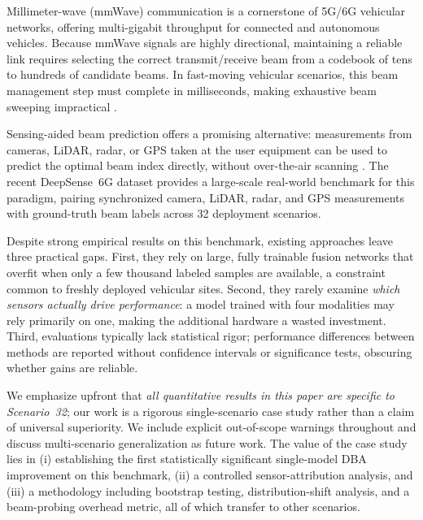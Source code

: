 \documentclass[journal,10pt,twoside]{IEEEtran}
\begin{document}
Millimeter-wave (mmWave) communication is a cornerstone of 5G/6G vehicular
networks, offering multi-gigabit throughput for connected and autonomous vehicles.
Because mmWave signals are highly directional, maintaining a reliable link
requires selecting the correct transmit/receive beam from a codebook of tens to
hundreds of candidate beams. In fast-moving vehicular scenarios, this beam
management step must complete in milliseconds, making exhaustive beam sweeping
impractical \cite{alkhateeb2018deep,va2016beam}.

Sensing-aided beam prediction offers a promising alternative: measurements
from cameras, LiDAR, radar, or GPS taken at the user equipment can be used
to predict the optimal beam index directly, without over-the-air scanning
\cite{charan2021vision,maeng2024multimodal,deepsense6g_2023}. The recent
DeepSense~6G dataset \cite{deepsense6g_2023} provides a large-scale real-world
benchmark for this paradigm, pairing synchronized camera, LiDAR, radar, and GPS
measurements with ground-truth beam labels across 32 deployment scenarios.

Despite strong empirical results on this benchmark, existing approaches leave
three practical gaps. First, they rely on large, fully trainable fusion networks
that overfit when only a few thousand labeled samples are available, a constraint common to freshly deployed vehicular sites. Second, they rarely examine
\emph{which sensors actually drive performance}: a model trained with four
modalities may rely primarily on one, making the additional hardware a wasted
investment. Third, evaluations typically lack statistical rigor; performance
differences between methods are reported without confidence intervals or
significance tests, obscuring whether gains are reliable.

We emphasize upfront that \emph{all quantitative results in this paper
are specific to Scenario~32}; our work is a rigorous single-scenario case
study rather than a claim of universal superiority. We include explicit
out-of-scope warnings throughout and discuss multi-scenario generalization
as future work. The value of the case study lies in (i) establishing the
first statistically significant single-model DBA improvement on this benchmark,
(ii) a controlled sensor-attribution analysis, and (iii) a methodology including bootstrap
testing, distribution-shift analysis, and a beam-probing overhead metric, all of which transfer to other scenarios.
\end{document}
